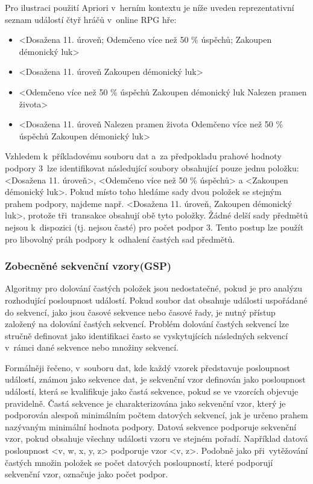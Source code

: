 \newpage

Pro ilustraci použití Apriori v~herním kontextu je níže uveden reprezentativní seznam událostí čtyř hráčů v~online RPG hře:
\begin{itemize}
	\item <Dosažena 11. úroveň; Odemčeno více než 50 \% úspěchů; Zakoupen démonický luk>
	\item <Dosažena 11. úroveň\; Zakoupen démonický luk>
	\item <Odemčeno více než 50 \% úspěchů\; Zakoupen démonický luk\; Nalezen pramen života>
	\item <Dosažena 11. úroveň\; Nalezen pramen života\; Odemčeno více než 50 \% úspěchů\; Zakoupen démonický luk>
\end{itemize}

Vzhledem k~příkladovému souboru dat a~za předpokladu prahové hodnoty podpory 3~lze identifikovat následující soubory obsahující pouze jednu položku: <Dosažena 11. úroveň>, <Odemčeno více než 50 \% úspěchů> a <Zakoupen démonický luk>. Pokud místo toho hledáme sady dvou položek se stejným prahem podpory, najdeme např. <Dosažena 11. úroveň, Zakoupen démonický luk>, protože tři~transakce obsahují obě tyto položky. Žádné delší sady předmětů nejsou k~dispozici (tj. nejsou časté) pro počet podpor 3. Tento postup lze použít pro libovolný práh podpory k~odhalení častých sad předmětů.

\subsubsection{Zobecněné sekvenční vzory(GSP)}
Algoritmy pro dolování častých položek jsou nedostatečné, pokud je pro analýzu rozhodující posloupnost událostí. Pokud soubor dat obsahuje události uspořádané do sekvencí, jako jsou časové sekvence nebo časové řady, je nutný přístup založený na dolování častých sekvencí. Problém dolování častých sekvencí lze stručně definovat jako identifikaci často se vyskytujících následných sekvencí v~rámci dané sekvence nebo množiny sekvencí.

Formálněji řečeno, v~souboru dat, kde každý vzorek představuje posloupnost událostí, známou jako sekvence dat, je sekvenční vzor definován jako posloupnost událostí, která se kvalifikuje jako častá sekvence, pokud se ve vzorcích objevuje pravidelně. Častá sekvence je charakterizována jako sekvenční vzor, který je podporován alespoň minimálním počtem datových sekvencí, jak je určeno prahem nazývaným minimální hodnota podpory. Datová sekvence podporuje sekvenční vzor, pokud obsahuje všechny události vzoru ve stejném pořadí. Například datová posloupnost <v, w, x, y, z> podporuje vzor <v, z>. Podobně jako při~vytěžování častých množin položek se počet datových posloupností, které podporují sekvenční vzor, označuje jako počet podpor.

